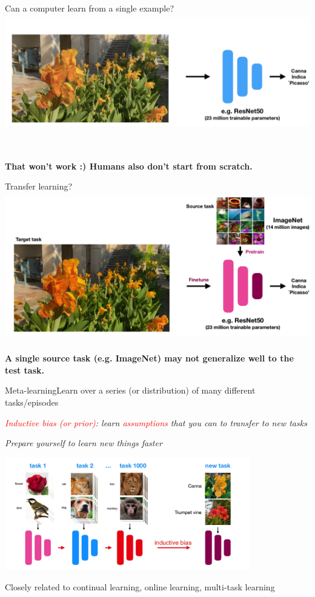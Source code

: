 \begin{frame}{Can a computer learn from a single example?}
\includegraphics[height=5cm]{image/img163023.jpg}

\hspace*{\fill} \
\hspace*{\fill} \
\pause
\centerline{\textbf{That won’t work :) Humans also don’t start from scratch.}}
\end{frame}


\begin{frame}{Transfer learning?}
\includegraphics[height=6.5cm]{image/img163705.jpg}

\pause
\small\centerline{\textbf{A single source task (e.g. ImageNet) may not generalize well to the test task.}}
\end{frame}

\begin{frame}{Meta-learning}{Learn over a series (or distribution) of many different tasks/episodes}
\centerline{\textit{\textcolor{red}{Inductive bias (or prior)}: learn \textcolor{red}{assumptions} that you can to transfer to new tasks}}
\centerline{\textit{Prepare yourself to learn new things faster}}
\centering\includegraphics[height=4.9cm]{image/img182859.jpg}

\pause
\leavevmode\hphantom{ }

\small\centerline{Closely related to continual learning, online learning, multi-task learning}
\end{frame}

